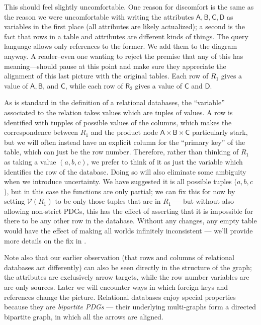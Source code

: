 \documentclass{article}
\theoremstyle{definition}
\theoremstyle{remark}
\newcommand{\V}{\mathcal V}
\newcommand{\var}[1]{\mathsf{#1}}
\begin{document}
\begin{example}
    This should feel slightly uncomfortable. One reason for discomfort is the same as the reason we were uncomfortable with writing the attributes $\var{A,B,C,D}$ as variables in the first place (all attributes are likely actualized); a second is the fact that rows in a table and attributes are different kinds of things. The query language allows only references to the former. We add them to the diagram anyway.
    A reader--even one wanting to reject the premise that any of this has meaning---should pause at this point and make sure they appreciate the alignment of this last picture with the original tables. Each row of $R_1$ gives a value of $\var{A,B}$, and $\var C$, while each row of $\var R_2$ gives a value of $\var{C}$ and $\var D$. 
    
    As is standard in the definition of a relational databases, the ``variable'' associated to the relation takes values which are tuples of values. A row is identified with tupples of possible values of the columns, which makes the correspondence between $R_1$ and the product node $\var{A \times B \times C}$ particularly stark, but we will often instead have an explicit column for the ``primary key'' of the table, which can just be the row number. Therefore, rather than thinking of $R_1$ as taking a value $(a,b,c)$, we prefer to think of it as just the variable which identifies the row of the database. Doing so will also eliminate some ambiguity when we introduce uncertainty.
    We have suggested it is all possible tuples ($a,b,c$), but in this case the functions are only partial; we can fix this for now by setting $\V(R_1)$ to be only those tuples that are in $R_1$ --- but without also allowing non-strict PDGs, this has the effect of asserting that it is impossible for there to be any other row in the database. Without any changes, any empty table would have the effect of making all worlds infinitely inconsistent --- we'll provide more details on the fix in .
        
    Note also that our earlier observation (that rows and columns of relational databases act differently) can also be seen directly in the structure of the graph; the attributes are exclusively arrow targets, while the row number variables are are only sources. Later we will encounter ways in which foreign keys and references change the picture. Relational databases enjoy special properties because they are \emph{bipartite PDGs} --- their underlying multi-graphs form a directed bipartite graph, in which all the arrows are aligned.
    
    

\end{example}
\end{document}
